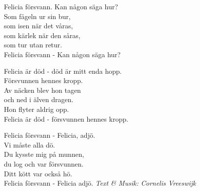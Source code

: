 \vspace{10pt}
Felicia försvann. Kan någon säga hur?\\
Som fågeln ur sin bur,\\
som isen när det våras,\\
som kärlek när den såras,\\
som tur utan retur.\\
Felicia försvann - Kan någon säga hur?\par
\vspace{10pt}
Felicia är död - död är mitt enda hopp.\\
Försvunnen hennes kropp.\\
Av näcken blev hon tagen\\
och ned i älven dragen.\\
Hon flyter aldrig opp.\\
Felicia är död - försvunnen hennes kropp.\par
\vspace{10pt}
Felicia försvann - Felicia, adjö.\\
Vi måste alla dö.\\
Du kysste mig på munnen,\\
du log och var försvunnen.\\
Ditt kött var också hö.\\
Felicia försvann - Felicia adjö.
\vspace{10pt}
{\footnotesize\textit{Text \& Musik: Cornelis Vreeswijk}}
